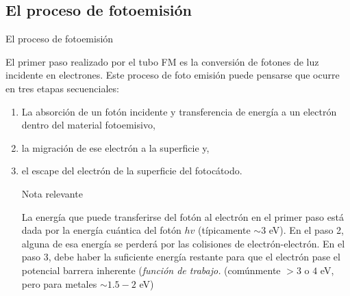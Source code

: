 \documentclass[a4paper,10pt]{beamer}
\begin{document}
\subsection{El proceso de fotoemisión}
\begin{frame}{El proceso de fotoemisión}
 
 \begin{justify}
  El primer paso realizado por el tubo FM es la conversión de fotones de luz incidente
  en electrones. Este proceso de foto emisión puede pensarse que ocurre en tres etapas
  secuenciales:
  
   \begin{enumerate} [<+->]
  \item La absorción de un fotón incidente y transferencia de energía a un electrón
  dentro del material fotoemisivo,
  \item la migración de ese electrón a la superficie y,
  \item el escape del electrón de la superficie del fotocátodo. 
    \begin{block}{Nota relevante}
  \footnotesize{\begin{justify}La energía que puede transferirse del fotón al electrón en el primer paso está
  dada por la energía cuántica del fotón $hv$ (típicamente $\sim 3$ eV). En el paso 2, alguna de esa energía
  se perderá por las colisiones de electrón-electrón. En el paso 3, debe haber
  la suficiente energía restante para que el electrón pase el potencial barrera
  inherente (\emph{función de trabajo.} (comúnmente $> 3$ o $4$ eV, pero para 
  metales $\sim 1.5-2$ eV)\end{justify}}
 \end{block}
 \end{enumerate}
 
 \end{justify}
  
\end{frame}
\end{document}
